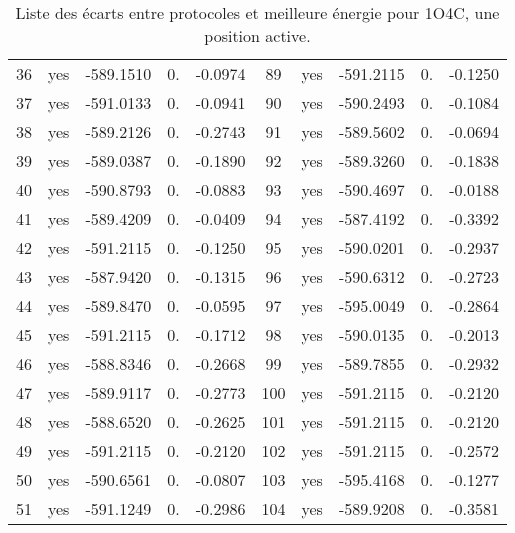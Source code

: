\begin{table}[h]
{\begin{tabular}{cccccccccc}
        36 & yes &  -589.1510 & 0.     &  -0.0974 &    89 & yes &  -591.2115 & 0.     &  -0.1250 \\
        37 & yes &  -591.0133 & 0.     &  -0.0941 &    90 & yes &  -590.2493 & 0.     &  -0.1084 \\
        38 & yes &  -589.2126 & 0.     &  -0.2743 &    91 & yes &  -589.5602 & 0.     &  -0.0694 \\
        39 & yes &  -589.0387 & 0.     &  -0.1890 &    92 & yes &  -589.3260 & 0.     &  -0.1838 \\
        40 & yes &  -590.8793 & 0.     &  -0.0883 &    93 & yes &  -590.4697 & 0.     &  -0.0188 \\
        41 & yes &  -589.4209 & 0.     &  -0.0409 &    94 & yes &  -587.4192 & 0.     &  -0.3392 \\
        42 & yes &  -591.2115 & 0.     &  -0.1250 &    95 & yes &  -590.0201 & 0.     &  -0.2937 \\
        43 & yes &  -587.9420 & 0.     &  -0.1315 &    96 & yes &  -590.6312 & 0.     &  -0.2723 \\
        44 & yes &  -589.8470 & 0.     &  -0.0595 &    97 & yes &  -595.0049 & 0.     &  -0.2864 \\
        45 & yes &  -591.2115 & 0.     &  -0.1712 &    98 & yes &  -590.0135 & 0.     &  -0.2013 \\
        46 & yes &  -588.8346 & 0.     &  -0.2668 &    99 & yes &  -589.7855 & 0.     &  -0.2932 \\
        47 & yes &  -589.9117 & 0.     &  -0.2773 &   100 & yes &  -591.2115 & 0.     &  -0.2120 \\
        48 & yes &  -588.6520 & 0.     &  -0.2625 &   101 & yes &  -591.2115 & 0.     &  -0.2120 \\
        49 & yes &  -591.2115 & 0.     &  -0.2120 &   102 & yes &  -591.2115 & 0.     &  -0.2572 \\
        50 & yes &  -590.6561 & 0.     &  -0.0807 &   103 & yes &  -595.4168 & 0.     &  -0.1277 \\
        51 & yes &  -591.1249 & 0.     &  -0.2986 &   104 & yes &  -589.9208 & 0.     &  -0.3581 \\
     
      
        \bottomrule
       
      \end{tabular}
}      
      \caption{Liste des écarts entre protocoles et meilleure énergie pour 1O4C, une position active.}
\label{tab:result_1_active_1O4C}
    \end{table}

